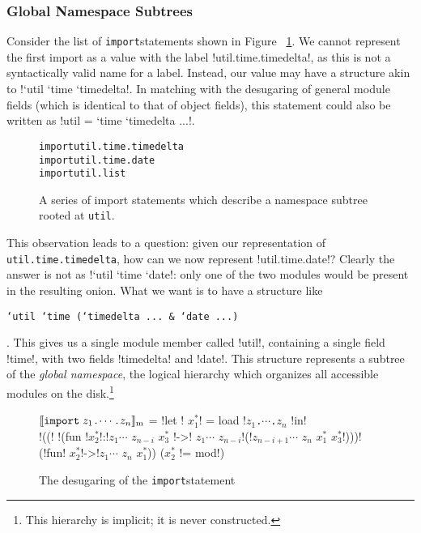 \documentclass{llncs}
\newcommand{\lbimport}{\texttt{import}\;}
\newcommand{\moddot}{\texttt{.}}
\newcommand{\translate}[2]{\ensuremath{\llbracket\texttt{#2}\rrbracket_{\textnormal{#1}}}}
\newcommand{\fresh}[1]{\ensuremath{x^*_{#1}}}
\begin{document}
\subsubsection{Global Namespace Subtrees}
\label{sss-glob-name-subtr}
\indent Consider the list of \lbimport statements shown in Figure ~\ref{fig-mod-import-subtree}. We cannot represent the first import as a value with the label \bt\lbil!util.time.timedelta!, as this is not a syntactically valid name for a label. Instead, our value may have a structure akin to \lbil!`util `time `timedelta!. In matching with the desugaring of general module fields (which is identical to that of object fields), this statement could also be written as \lbil!util = `time `timedelta ...!.\\
\begin{figure}[h]
\lbimport \texttt{util.time.timedelta}\\
\lbimport \texttt{util.time.date}\\
\lbimport \texttt{util.list}
\caption{A series of import statements which describe a namespace subtree rooted at \texttt{util}.}
\label{fig-mod-import-subtree}
\end{figure}
\indent This observation leads to a question: given our representation of\\ \texttt{util.time.timedelta}, how can we now represent \lbil!util.time.date!? Clearly the answer is not as \lbil!`util `time `date!: only one of the two modules would be present in the resulting onion. What we want is to have a structure like \begin{small}\texttt{`util `time (`timedelta ... \& `date ...)}\end{small}. This gives us a single module member called \lbil!util!, containing a single field \lbil!time!, with two fields \lbil!timedelta! and \lbil!date!. This structure represents a subtree of the \emph{global namespace}, the logical hierarchy which organizes all accessible modules on the disk.\footnote{This hierarchy is implicit; it is never constructed.}\\
\begin{figure}[h]
\translate{m}{\lbimport $z_1$\moddot$\cdots$\moddot$z_n$} = \lbil!let ! \fresh{1}\lbil! = load !$z_1$\moddot$\cdots$\moddot$z_n$ \lbil!in! \\
\lbil!((! \lbil!(fun !\fresh{2}\lbil!:!\bt $z_1\cdots$ \bt $z_{n-i}$ \fresh{3} \lbil!->! \bt $z_1\cdots$ \bt $z_{n-i}$\lbil!(!\bt $z_{n-i+1}\cdots$ \bt $z_n$ \fresh{1} \lbonion \fresh{3}\lbil!)))!\\
\lbonion (\lbil!fun! \fresh{2}\lbil!->!\bt $z_1\cdots$ \bt $z_n$ \fresh{1})) (\fresh{2} \lbil!= mod!)

\caption{The desugaring of the \lbimport statement}
\label{fig-mod-import-trans}
\end{figure}
\end{document}
